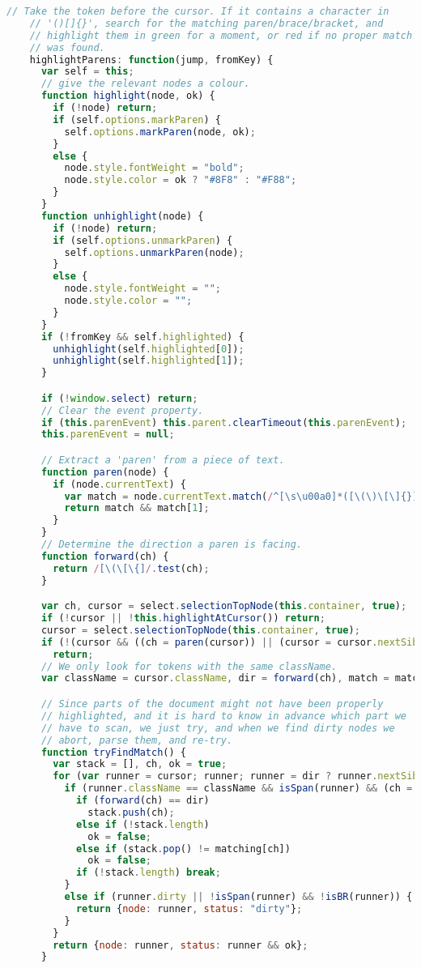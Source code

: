 \begin{lstlisting}[language=Javascript]
    // Take the token before the cursor. If it contains a character in
    // '()[]{}', search for the matching paren/brace/bracket, and
    // highlight them in green for a moment, or red if no proper match
    // was found.
    highlightParens: function(jump, fromKey) {
      var self = this;
      // give the relevant nodes a colour.
      function highlight(node, ok) {
        if (!node) return;
        if (self.options.markParen) {
          self.options.markParen(node, ok);
        }
        else {
          node.style.fontWeight = "bold";
          node.style.color = ok ? "#8F8" : "#F88";
        }
      }
      function unhighlight(node) {
        if (!node) return;
        if (self.options.unmarkParen) {
          self.options.unmarkParen(node);
        }
        else {
          node.style.fontWeight = "";
          node.style.color = "";
        }
      }
      if (!fromKey && self.highlighted) {
        unhighlight(self.highlighted[0]);
        unhighlight(self.highlighted[1]);
      }

      if (!window.select) return;
      // Clear the event property.
      if (this.parenEvent) this.parent.clearTimeout(this.parenEvent);
      this.parenEvent = null;

      // Extract a 'paren' from a piece of text.
      function paren(node) {
        if (node.currentText) {
          var match = node.currentText.match(/^[\s\u00a0]*([\(\)\[\]{}])[\s\u00a0]*$/);
          return match && match[1];
        }
      }
      // Determine the direction a paren is facing.
      function forward(ch) {
        return /[\(\[\{]/.test(ch);
      }

      var ch, cursor = select.selectionTopNode(this.container, true);
      if (!cursor || !this.highlightAtCursor()) return;
      cursor = select.selectionTopNode(this.container, true);
      if (!(cursor && ((ch = paren(cursor)) || (cursor = cursor.nextSibling) && (ch = paren(cursor)))))
        return;
      // We only look for tokens with the same className.
      var className = cursor.className, dir = forward(ch), match = matching[ch];

      // Since parts of the document might not have been properly
      // highlighted, and it is hard to know in advance which part we
      // have to scan, we just try, and when we find dirty nodes we
      // abort, parse them, and re-try.
      function tryFindMatch() {
        var stack = [], ch, ok = true;
        for (var runner = cursor; runner; runner = dir ? runner.nextSibling : runner.previousSibling) {
          if (runner.className == className && isSpan(runner) && (ch = paren(runner))) {
            if (forward(ch) == dir)
              stack.push(ch);
            else if (!stack.length)
              ok = false;
            else if (stack.pop() != matching[ch])
              ok = false;
            if (!stack.length) break;
          }
          else if (runner.dirty || !isSpan(runner) && !isBR(runner)) {
            return {node: runner, status: "dirty"};
          }
        }
        return {node: runner, status: runner && ok};
      }


\end{lstlisting}
